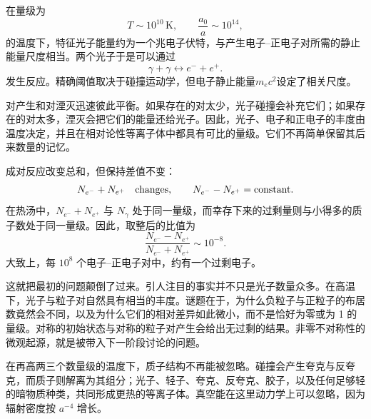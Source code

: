 在量级为
\begin{equation}
T\sim10^{10}\,\mathrm{K},
\qquad
\frac{a_0}{a}\sim10^{14},
\end{equation}
的温度下，特征光子能量约为一个兆电子伏特，与产生电子--正电子对所需的静止能量尺度相当。两个光子于是可以通过
\begin{equation}
\gamma+\gamma
\longleftrightarrow
e^-+e^+.
\label{eq:c07-pair-reaction}
\end{equation}
发生反应。精确阈值取决于碰撞运动学，但电子静止能量\(m_ec^2\)设定了相关尺度。

对产生和对湮灭迅速彼此平衡。如果存在的对太少，光子碰撞会补充它们；如果存在的对太多，湮灭会把它们的能量还给光子。因此，光子、电子和正电子的丰度由温度决定，并且在相对论性等离子体中都具有可比的量级。它们不再简单保留其后来数量的记忆。

\begin{classroomqa}
\end{classroomqa}

成对反应改变总和，但保持差值不变：
\begin{equation}
N_{e^-}+N_{e^+}\quad\hbox{changes},
\qquad
N_{e^-}-N_{e^+}=\hbox{constant}.
\label{eq:c07-pair-invariants}
\end{equation}
在热汤中，\(N_{e^-}+N_{e^+}\) 与 \(N_\gamma\) 处于同一量级，而幸存下来的过剩量则与小得多的质子数处于同一量级。因此，取整后的比值为
\begin{equation}
\boxed{
\frac{N_{e^-}-N_{e^+}}
{N_{e^-}+N_{e^+}}
\sim10^{-8}
}.
\label{eq:c07-asymmetry}
\end{equation}
大致上，每 \(10^8\) 个电子--正电子对中，约有一个过剩电子。

这就把最初的问题颠倒了过来。引人注目的事实并不只是光子数量众多。在高温下，光子与粒子对自然具有相当的丰度。谜题在于，为什么负粒子与正粒子的布居数竟然会不同，以及为什么它们的相对差异如此微小，而不是恰好为零或为 1 的量级。对称的初始状态与对称的粒子对产生会给出无过剩的结果。非零不对称性的微观起源，就是被带入下一阶段讨论的问题。

在再高两三个数量级的温度下，质子结构不再能被忽略。碰撞会产生夸克与反夸克，而质子则解离为其组分；光子、轻子、夸克、反夸克、胶子，以及任何足够轻的暗物质种类，共同形成更热的等离子体。真空能在这里动力学上可以忽略，因为辐射密度按 \(a^{-4}\) 增长。

